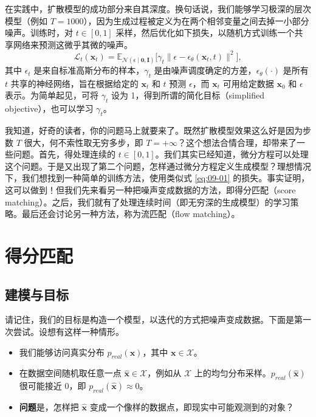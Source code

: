 在实践中，扩散模型的成功部分来自其深度。换句话说，我们能够学习极深的层次模型（例如 $T=1000$），因为生成过程被定义为在两个相邻变量之间去掉一小部分噪声。训练时，对 $t\in[0,1]$ 采样，然后优化如下损失，以随机方式训练一个共享网络来预测这微乎其微的噪声。
\begin{equation}
  \mathcal L_t(\mathbf x_t)=\mathbb E_{\mathcal N(\epsilon\mid\mathbf 0,\mathbf I)}
  \bigl[\gamma_t\lVert\epsilon-\epsilon_\theta(\mathbf x_t,t)\rVert^2\bigr],
  \tag{9.1}\label{eq:09-01}
\end{equation}
其中 $\epsilon_t$ 是来自标准高斯分布的样本，$\gamma_t$ 是由噪声调度确定的方差，$\epsilon_\theta(\cdot)$ 是所有 $t$ 共享的神经网络，旨在根据给定的 $\mathbf x_t$ 和 $t$ 预测 $\epsilon$，而 $\mathbf x_t$ 可用给定数据 $\mathbf x_0$ 和 $\epsilon$ 表示。为简单起见，可将 $\gamma_t$ 设为 1，得到所谓的简化目标（simplified objective），也可以学习 $\gamma_t$。

我知道，好奇的读者，你的问题马上就要来了。既然扩散模型效果这么好是因为步数 $T$ 很大，何不索性取无穷多步，即 $T=+\infty$？这个想法合情合理，却带来了一些问题。首先，得处理连续的 $t\in[0,1]$。我们其实已经知道，微分方程可以处理这个问题。于是又出现了第二个问题，怎样通过微分方程定义生成模型？理想情况下，我们想找到一种简单的训练方法，使用类似式 \eqref{eq:09-01} 的损失。事实证明，这可以做到！但我们先来看另一种把噪声变成数据的方法，即得分匹配（score matching）。之后，我们就有了处理连续时间（即无穷深的生成模型）的学习策略。最后还会讨论另一种方法，称为流匹配（flow matching）。

\section{得分匹配}
\label{sec:09-02}

\subsection{建模与目标}

请记住，我们的目标是构造一个模型，以迭代的方式把噪声变成数据。下面是第一次尝试。设想有这样一种情形。
\begin{itemize}
  \item 我们能够访问真实分布 $p_{\mathit{real}}(\mathbf x)$，其中 $\mathbf x\in\mathcal X$。
  \item 在数据空间随机取任意一点 $\hat{\mathbf x}\in\mathcal X$，例如从 $\mathcal X$ 上的均匀分布采样。$p_{\mathit{real}}(\hat{\mathbf x})$ 很可能接近 0，即 $p_{\mathit{real}}(\hat{\mathbf x})\approx0$。
  \item \textbf{问题}是，怎样把 $\hat{\mathbf x}$ 变成一个像样的数据点，即现实中可能观测到的对象？
\end{itemize}

